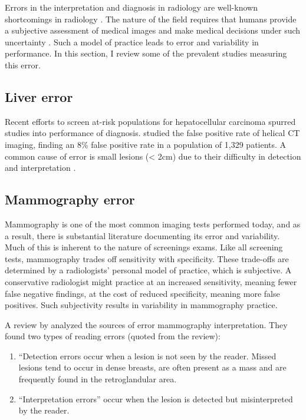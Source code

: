 Errors in the interpretation and diagnosis in radiology are well-known shortcomings in radiology \cite{Fitzgerald:2001hn}. The nature of the field requires that humans provide a subjective assessment of medical images and make medical decisions under such uncertainty \cite{Wood:1999ew}. Such a model of practice leads to error and variability in performance. In this section, I review some of the prevalent studies measuring this error.

\subsection{Liver error}
Recent efforts to screen at-risk populations for hepatocellular carcinoma spurred studies into performance of diagnosis.  studied the false positive rate of helical CT imaging, finding an 8\% false positive rate in a population of 1,329 patients. A common cause of error is small lesions (< 2cm) due to their difficulty in detection and interpretation \cite{Willatt:2008gs,Lencioni:2005ia}. 

\subsection{Mammography error}
Mammography is one of the most common imaging tests performed today, and as a result, there is substantial literature documenting its error and variability. Much of this is inherent to the nature of screenings exams. Like all screening tests, mammography trades off sensitivity with specificity. These trade-offs are determined by a radiologists' personal model of practice, which is subjective. A conservative radiologist might practice at an increased sensitivity, meaning fewer false negative findings, at the cost of reduced specificity, meaning more false positives. Such subjectivity results in variability in mammography practice. 

A review by  analyzed the sources of error mammography interpretation. They found two types of reading errors (quoted from the review):

\begin{enumerate}
	\item ``Detection errors occur when a lesion is not seen by the reader. Missed lesions tend to occur in dense breasts, are often present as a mass and are frequently found in the retroglandular area.
	
	\item ``Interpretation errors'' occur when the lesion is detected but misinterpreted by the reader.
\end{enumerate}

